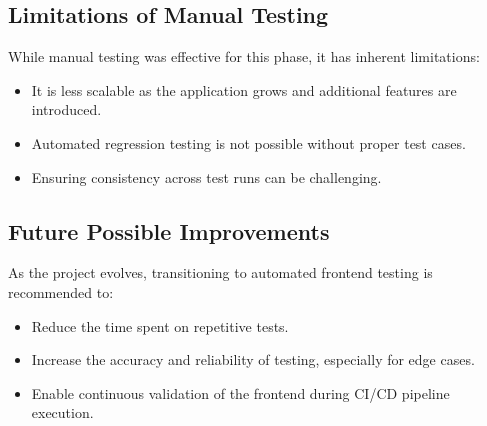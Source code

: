 \documentclass[a4paper]{article}
\begin{document}
\subsection{Limitations of Manual Testing}
While manual testing was effective for this phase, it has inherent limitations:
\begin{itemize}
    \item It is less scalable as the application grows and additional features are introduced.
    \item Automated regression testing is not possible without proper test cases.
    \item Ensuring consistency across test runs can be challenging.
\end{itemize}

\subsection{Future Possible Improvements}
As the project evolves, transitioning to automated frontend testing is recommended to:
\begin{itemize}
    \item Reduce the time spent on repetitive tests.
    \item Increase the accuracy and reliability of testing, especially for edge cases.
    \item Enable continuous validation of the frontend during CI/CD pipeline execution.
\end{itemize}

\end{document}

